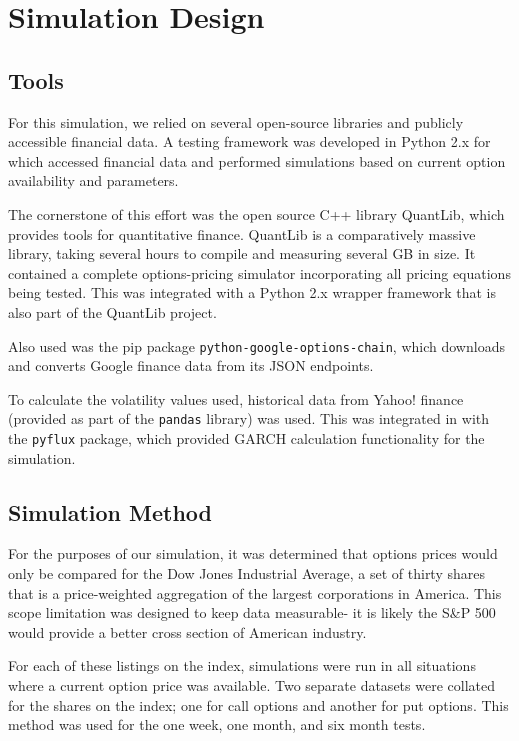 \chapter{Simulation Design}
\section{Tools}

For this simulation, we relied on several open-source libraries and publicly accessible financial data. A testing framework was developed in Python 2.x for which accessed financial data and performed simulations based on current option availability and parameters. 

The cornerstone of this effort was the open source C++ library QuantLib, which provides tools for quantitative finance. QuantLib is a comparatively massive library, taking several hours to compile and measuring several GB in size. It contained a complete options-pricing simulator incorporating all pricing equations being tested. This was integrated with a Python 2.x wrapper framework that is also part of the QuantLib project.

Also used was the pip package \verb|python-google-options-chain|, which downloads and converts Google finance data from its JSON endpoints. 

To calculate the volatility values used, historical data from Yahoo! finance (provided as part of the \verb|pandas| library) was used. This was integrated in with the \verb|pyflux| package, which provided GARCH calculation functionality for the simulation.

\section{Simulation Method}
For the purposes of our simulation, it was determined that options prices would only be compared for the Dow Jones Industrial Average, a set of thirty shares that is a price-weighted aggregation of the largest corporations in America. This scope limitation was designed to keep data measurable- it is likely the S\&P 500 would provide a better cross section of American industry. 

For each of these listings on the index, simulations were run in all situations where a current option price was available. Two separate datasets were collated for the shares on the index; one for call options and another for put options. This method was used for the one week, one month, and six month tests.

